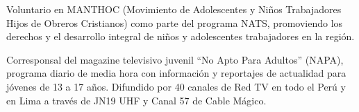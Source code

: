 

\begin{scholarship}
	
	{Voluntario en MANTHOC (Movimiento de Adolescentes y Niños Trabajadores
		Hijos de Obreros Cristianos) como parte del programa NATS,
		promoviendo los derechos y el desarrollo integral de niños y adolescentes
		trabajadores en la región.}
	
	{Corresponsal del magazine televisivo juvenil ``No Apto Para Adultos'' (NAPA),
		programa diario de media hora con información y reportajes de actualidad para
		jóvenes de 13 a 17 años. Difundido por 40 canales de Red TV en todo el Perú
		y en Lima a través de JN19 UHF y Canal 57 de Cable Mágico.}
	
\end{scholarship}
